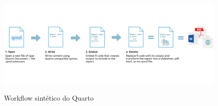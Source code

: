 \documentclass[
  a4paper,
]{article}
\begin{document}
\begin{figure}

\href{https://ucsbcarpentry.github.io/Reproducible-Publications-with-RStudio-Quarto/02-quarto/03-quarto-documents/index.html}{\includegraphics{img/qmd-workflow.png}}

\caption{\label{fig-qmd-workflow}Workflow sintético do Quarto}

\end{figure}%
\end{document}

